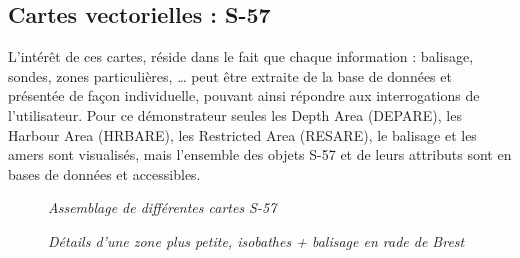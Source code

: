 \subsection{Cartes vectorielles : S-57}
L'intérêt de ces cartes, réside dans le fait que chaque information : balisage, sondes, zones particulières, \ldots\hspace{.1cm} peut être extraite de la base de données et présentée de façon individuelle, pouvant ainsi répondre aux interrogations de l'utilisateur. Pour ce démonstrateur seules les Depth Area (DEPARE), les Harbour Area (HRBARE), les Restricted Area (RESARE), le balisage et les amers sont visualisés, mais l'ensemble des objets S-57 et de leurs attributs sont en bases de données et accessibles.
\begin{center}
\begin{figure}[ht]
\caption{\label{equiProj}\textit{Assemblage de différentes cartes S-57}}
\end{figure}
\end{center}
\begin{center}
\begin{figure}[ht]
\caption{\label{equiProj}\textit{Détails d'une zone plus petite, isobathes + balisage en rade de Brest}}
\end{figure}
\end{center}
